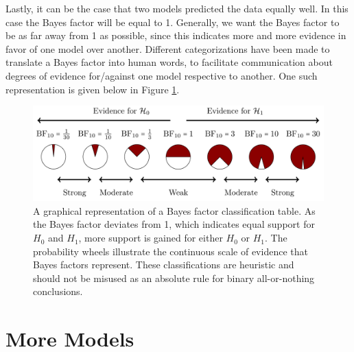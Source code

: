 \documentclass[
]{book}
\begin{document}
Lastly, it can be the case that two models predicted the data equally well. In this case the Bayes factor will be equal to 1. Generally, we want the Bayes factor to be as far away from 1 as possible, since this indicates more and more evidence in favor of one model over another. Different categorizations have been made to translate a Bayes factor into human words, to facilitate communication about degrees of evidence for/against one model respective to another. One such representation is given below in Figure \ref{fig:bayes-factor-classification}.

\begin{figure}

{\centering \includegraphics[width=0.9\linewidth]{Figures/BF_TableInterpretation} 

}

\caption{A graphical representation of a Bayes factor classification table. As the Bayes factor deviates from 1, which indicates equal support for $H_0$ and $H_1$, more support is gained for either $H_0$ or $H_1$. The probability wheels illustrate the continuous scale of evidence that Bayes factors represent. These classifications are heuristic and should not be misused as an absolute rule for binary all-or-nothing conclusions.}\label{fig:bayes-factor-classification}
\end{figure}

\hypertarget{more-models-section}{%
\section{More Models}\label{more-models-section}}
\end{document}
